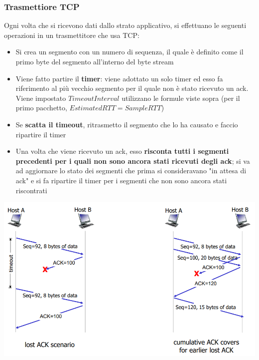 \documentclass[12pt]{article}
\begin{document}
\subsubsection{Trasmettiore TCP}
Ogni volta che si ricevono dati dallo strato applicativo, si effettuano le seguenti operazioni in un trasmettitore che usa TCP:\
\begin{itemize}
    \item Si crea un segmento con un numero di sequenza, il quale è definito come il primo byte del segmento all'interno del byte stream
    \item Viene fatto partire il \textbf{timer}: viene adottato un solo timer ed esso fa riferimento al più vecchio segmento per il quale non è stato ricevuto un ack. Viene impostato $TimeoutInterval$ utilizzano le formule viste sopra (per il primo pacchetto, $EstimatedRTT = SampleRTT$)
    \item Se \textbf{scatta il timeout}, ritrasmetto il segmento che lo ha causato e faccio ripartire il timer
    \item Una volta che viene ricevuto un ack, esso \textbf{risconta tutti i segmenti precedenti per i quali non sono ancora stati ricevuti degli ack}; si va ad aggiornare lo stato dei segmenti che prima si consideravano "in attesa di ack" e si fa ripartire il timer per i segmenti che non sono ancora stati riscontrati
\end{itemize}
\begin{center}
    \includegraphics[width = 0.75\linewidth]{Images/59.png}
\end{center}
\end{document}

